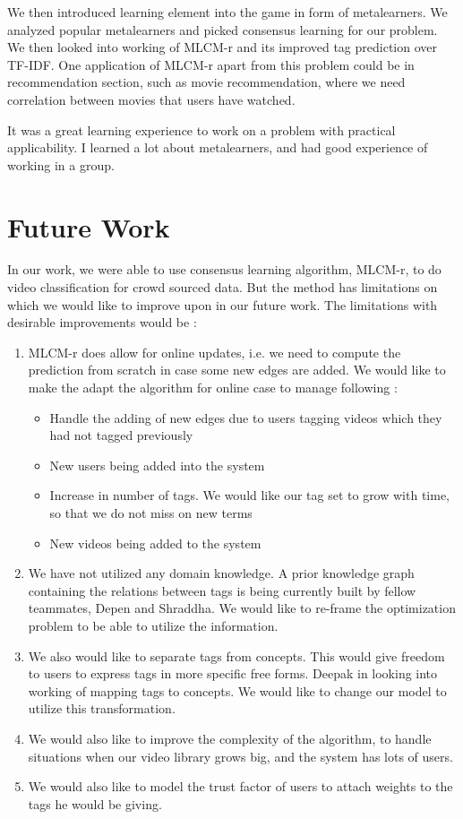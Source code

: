 \documentclass[12pt]{report}
\begin{document}
We then introduced learning element into the game in form of metalearners. We analyzed popular metalearners and picked consensus learning for our problem. We then looked into working of MLCM-r and its improved tag prediction over TF-IDF. One application of MLCM-r apart from this problem could be in recommendation section, such as movie recommendation, where we need correlation between movies that users have watched.

It was a great learning experience to work on a problem with practical applicability. I learned a lot about metalearners, and had good experience of working in a group. 
\pagebreak


\section{Future Work}
In our work, we were able to use consensus learning algorithm, MLCM-r, to do video classification for crowd sourced data. But the method has limitations on which we would like to improve upon in our future work. The limitations with desirable improvements would be :
\begin{enumerate}
\item MLCM-r does allow for online updates, i.e. we need to compute the prediction from scratch in case some new edges are added. We would like to make the adapt the algorithm for online case to manage following :
	\begin{itemize}
		\item Handle the adding of new edges due to users tagging videos which they had not tagged previously	
		\item New users being added into the system
		\item Increase in number of tags. We would like our tag set to grow with time, so that we do not miss on new terms
		\item New videos being added to the system
	\end{itemize}
\item We have not utilized any domain knowledge. A prior knowledge graph containing the relations between tags is being currently built by fellow teammates, Depen and Shraddha. We would like to re-frame the optimization problem to be able to utilize the information. 
\item We also would like to separate tags from concepts. This would give freedom to users to express tags in more specific free forms. Deepak in looking into working of mapping tags to concepts. We would like to change our model to utilize this transformation.
\item We would also like to improve the complexity of the algorithm, to handle situations when our video library grows big, and the system has lots of users.
\item We would also like to model the trust factor of users to attach weights to the tags he would be giving.
\end{enumerate}
\end{document}

